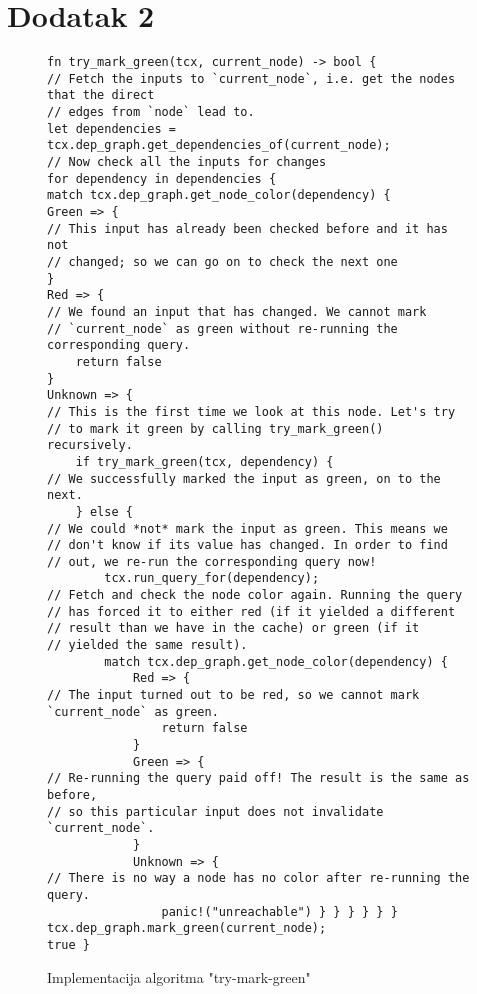 \section{Dodatak 2}
\begin{figure}[H]
\begin{listing}[H]
\begin{verbatim}
fn try_mark_green(tcx, current_node) -> bool {
// Fetch the inputs to `current_node`, i.e. get the nodes that the direct
// edges from `node` lead to.
let dependencies = tcx.dep_graph.get_dependencies_of(current_node);
// Now check all the inputs for changes
for dependency in dependencies {
match tcx.dep_graph.get_node_color(dependency) {
Green => {
// This input has already been checked before and it has not
// changed; so we can go on to check the next one
}
Red => {
// We found an input that has changed. We cannot mark
// `current_node` as green without re-running the corresponding query.
    return false
}
Unknown => {
// This is the first time we look at this node. Let's try
// to mark it green by calling try_mark_green() recursively.
    if try_mark_green(tcx, dependency) {
// We successfully marked the input as green, on to the next.
    } else {
// We could *not* mark the input as green. This means we
// don't know if its value has changed. In order to find
// out, we re-run the corresponding query now!
        tcx.run_query_for(dependency);
// Fetch and check the node color again. Running the query
// has forced it to either red (if it yielded a different
// result than we have in the cache) or green (if it
// yielded the same result).
        match tcx.dep_graph.get_node_color(dependency) {
            Red => {
// The input turned out to be red, so we cannot mark `current_node` as green.
                return false
            }
            Green => {
// Re-running the query paid off! The result is the same as before, 
// so this particular input does not invalidate `current_node`.
            }
            Unknown => {
// There is no way a node has no color after re-running the query.
                panic!("unreachable") } } } } } }
tcx.dep_graph.mark_green(current_node);
true }
\end{verbatim}
\caption{Implementacija algoritma "try-mark-green"}
\label{lst:bonus_try_mark_green}
\end{listing}
\end{figure}